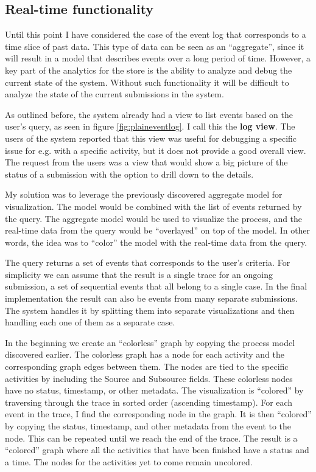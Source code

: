 \subsection{Real-time functionality}

Until this point I have considered the case of the event log that corresponds to a time slice of past data.
This type of data can be seen as an ``aggregate'', since it will result in a model that describes events over a long period of time.
However, a key part of the analytics for the store is the ability to analyze and debug the current state of the system.
Without such functionality it will be difficult to analyze the state of the current submissions in the system.

As outlined before, the system already had a view to list events based on the user's query, as seen in figure \ref{fig:plaineventlog}.
I call this the \textbf{log view}.
The users of the system reported that this view was useful for debugging a specific issue for e.g. with a specific activity, but it does not provide a good overall view.
The request from the users was a view that would show a big picture of the status of a submission with the option to drill down to the details.

My solution was to leverage the previously discovered aggregate model for visualization.
The model would be combined with the list of events returned by the query.
The aggregate model would be used to visualize the process, and the real-time data from the query would be ``overlayed'' on top of the model.
In other words, the idea was to ``color'' the model with the real-time data from the query.

The query returns a set of events that corresponds to the user's criteria.
For simplicity we can assume that the result is a single trace for an ongoing submission,
a set of sequential events that all belong to a single case.
In the final implementation the result can also be events from many separate submissions.
The system handles it by splitting them into separate visualizations and then handling each one of them as a separate case.

In the beginning we create an ``colorless'' graph by copying the process model discovered earlier.
The colorless graph has a node for each activity and the corresponding graph edges between them.
The nodes are tied to the specific activities by including the Source and Subsource fields. 
These colorless nodes have no status, timestamp, or other metadata.
The visualization is ``colored'' by traversing through the trace in sorted order (ascending timestamp).
For each event in the trace, I find the corresponding node in the graph.
It is then ``colored'' by copying the status, timestamp, and other metadata from the event to the node.
This can be repeated until we reach the end of the trace.
The result is a ``colored'' graph where all the activities that have been finished have a status and a time.
The nodes for the activities yet to come remain uncolored.


